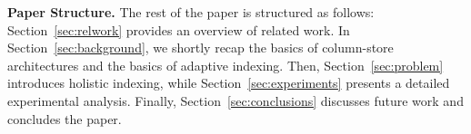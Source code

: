 \textbf{Paper Structure.} The rest of the paper is structured as follows:
Section~\ref{sec:relwork} provides an overview of related work.
In Section~\ref{sec:background}, we shortly recap the basics of column-store architectures 
and the basics of adaptive indexing.
Then, Section~\ref{sec:problem} introduces holistic indexing, while Section~\ref{sec:experiments} presents a detailed experimental analysis.
Finally, Section~\ref{sec:conclusions} discusses future work and concludes the paper. 


